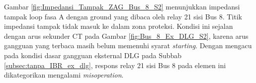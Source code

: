 Gambar \ref{fig:Impedansi_Tampak_ZAG_Bus_8_S2} menunjukkan impedansi tampak loop fasa A dengan ground yang dibaca oleh relay 21 sisi Bus 8. Titik impedansi tampak tidak masuk ke dalam zona proteksi. Kondisi ini sejalan dengan arus sekunder CT pada Gambar \ref{fig:Bus_8_Ex_DLG_S2}, karena arus gangguan yang terbaca masih belum memenuhi syarat \textit{starting}. Dengan mengacu pada kondisi dasar gangguan eksternal DLG pada Subbab \ref{subsec:tanpa_IBR_ex_dlg}, respons relay 21 sisi Bus 8 pada elemen ini dikategorikan mengalami \textit{misoperation}.








